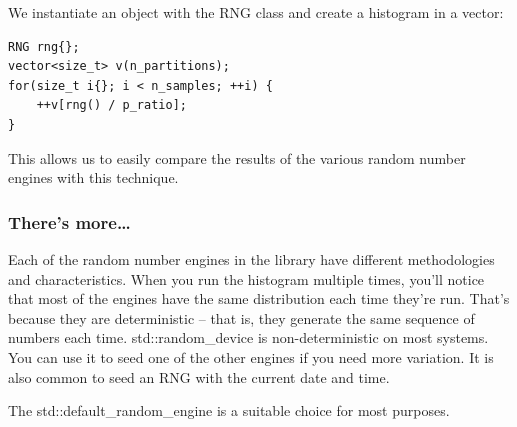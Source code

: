 We instantiate an object with the RNG class and create a histogram in a vector:

\begin{lstlisting}[style=styleCXX]
RNG rng{};
vector<size_t> v(n_partitions);
for(size_t i{}; i < n_samples; ++i) {
	++v[rng() / p_ratio];
}
\end{lstlisting}

This allows us to easily compare the results of the various random number engines with this technique.


\subsubsection{There's more…}

Each of the random number engines in the library have different methodologies and characteristics. When you run the histogram multiple times, you'll notice that most of the engines have the same distribution each time they're run. That's because they are deterministic – that is, they generate the same sequence of numbers each time. std::random\_device is non-deterministic on most systems. You can use it to seed one of the other engines if you need more variation. It is also common to seed an RNG with the current date and time.

The std::default\_random\_engine is a suitable choice for most purposes.


















